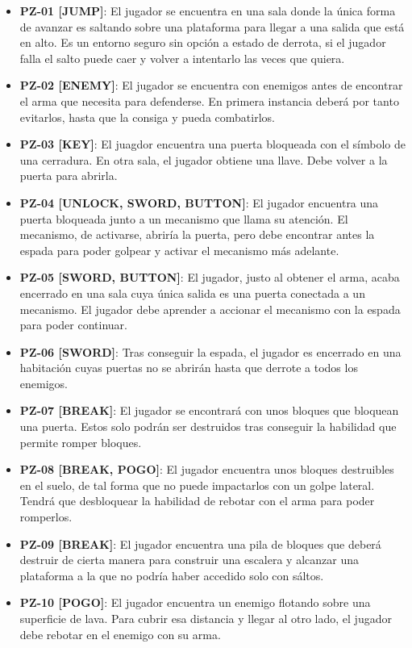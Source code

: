\begin{itemize}
    \item \textbf{PZ-01 [JUMP]}: El jugador se encuentra en una sala donde la única forma de avanzar es saltando sobre una plataforma para llegar a una salida que está en alto. Es un entorno seguro sin opción a estado de derrota, si el jugador falla el salto puede caer y volver a intentarlo las veces que quiera.
    \item \textbf{PZ-02 [ENEMY]}: El jugador se encuentra con enemigos antes de encontrar el arma que necesita para defenderse. En primera instancia deberá por tanto evitarlos, hasta que la consiga y pueda combatirlos.
    \item \textbf{PZ-03 [KEY]}: El juagdor encuentra una puerta bloqueada con el símbolo de una cerradura. En otra sala, el jugador obtiene una llave. Debe volver a la puerta para abrirla.
    \item \textbf{PZ-04 [UNLOCK, SWORD, BUTTON]}: El jugador encuentra una puerta bloqueada junto a un mecanismo que llama su atención. El mecanismo, de activarse, abriría la puerta, pero debe encontrar antes la espada para poder golpear y activar el mecanismo más adelante.
    \item \textbf{PZ-05 [SWORD, BUTTON]}: El jugador, justo al obtener el arma, acaba encerrado en una sala cuya única salida es una puerta conectada a un mecanismo. El jugador debe aprender a accionar el mecanismo con la espada para poder continuar.
    \item \textbf{PZ-06 [SWORD]}: Tras conseguir la espada, el jugador es encerrado en una habitación cuyas puertas no se abrirán hasta que derrote a todos los enemigos.
    \item \textbf{PZ-07 [BREAK]}: El jugador se encontrará con unos bloques que bloquean una puerta. Estos solo podrán ser destruidos tras conseguir la habilidad que permite romper bloques.
    \item \textbf{PZ-08 [BREAK, POGO]}: El jugador encuentra unos bloques destruibles en el suelo, de tal forma que no puede impactarlos con un golpe lateral. Tendrá que desbloquear la habilidad de rebotar con el arma para poder romperlos.
    \item \textbf{PZ-09 [BREAK]}: El jugador encuentra una pila de bloques que deberá destruir de cierta manera para construir una escalera y alcanzar una plataforma a la que no podría haber accedido solo con sáltos.
    \item \textbf{PZ-10 [POGO]}: El jugador encuentra un enemigo flotando sobre una superficie de lava. Para cubrir esa distancia y llegar al otro lado, el jugador debe rebotar en el enemigo con su arma.

\end{itemize}
